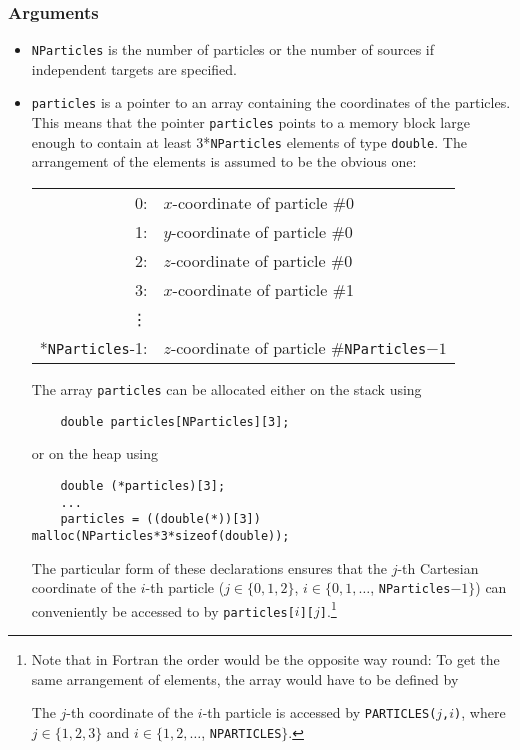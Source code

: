 \subsubsection*{Arguments}
\begin{itemize}
\item {\verb|NParticles|} is the number of particles or the number
	of sources if independent targets are specified.
\item {\verb|particles|} is a pointer to an array containing the coordinates 
	of the particles. This means that the pointer \verb|particles|
	points to a memory block large enough to contain at least
	3*\verb|NParticles| elements of type \verb|double|. The arrangement
	of the elements is assumed to be the obvious one:

	\begin{tabular}{rl}\
		0: & $x$-coordinate of particle \#0\\
		1: & $y$-coordinate of particle \#0\\
		2: & $z$-coordinate of particle \#0\\
		3: & $x$-coordinate of particle \#1\\
		\vdots & \\
		\qquad
		3*\verb|NParticles|-1: & $z$-coordinate of particle \#\verb|NParticles|$-1$ 
	\end{tabular}	

	The array \verb|particles| can be allocated either on the stack
	using
\begin{verbatim}
    double particles[NParticles][3];
\end{verbatim}
	or on the heap using
\begin{verbatim}
    double (*particles)[3];
    ...
    particles = ((double(*))[3]) malloc(NParticles*3*sizeof(double));
\end{verbatim}
	The particular form of these declarations ensures that the 
	$j$-th Cartesian coordinate of the $i$-th particle
	($j\in\{0,1,2\}$, $i\in\{0,1,\dots$, \verb|NParticles|$-1\}$)
	can conveniently be accessed to by
	\verb|particles[|$i$\verb|][|$j$\verb|]|.\footnote{Note that in Fortran
	the order would be the opposite way round: 
	To get the same arrangement of elements, 
	the array would have to be defined by 
	
	\medskip
	\medskip

	\noindent The $j$-th coordinate  of the $i$-th particle is  
	accessed by {\tt PARTICLES(}$j${\tt ,}$i${\tt )}, where
	$j\in\{1,2,3\}$ and $i\in\{1,2,\dots$, {\tt NPARTICLES}$\}$.}


\end{itemize}
